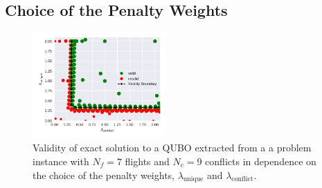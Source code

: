 \subsection{Choice of the Penalty Weights}
\begin{figure}[htpb]
    \centering
    \includegraphics[width=0.45\textwidth,natwidth=1,natheight=0]{./pics/validity_boundary_example.pdf}
    \caption{Validity of exact solution to a QUBO extracted from a a problem instance with $N_f=7$ flights and $N_c=9$ conflicts in dependence on the choice of the penalty weights, $\lambda_\text{unique}$ and $\lambda_\text{conflict}$.}
    \label{fig:penalty_weights}
\end{figure}

